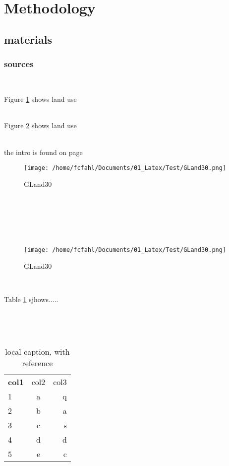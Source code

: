 \documentclass{report}
\begin{document}
\lipsum[6]\

\lipsum[7]\

\section{Methodology}\label{sec:meth}
\subsection{materials}

\subsubsection{sources}

\lipsum[8]\
\lipsum[9]\

Figure \ref{fig:gland30} shows land use\\

\lipsum[9]\

Figure \ref{fig:gland30_2} shows land use\\

\lipsum[10]\
\lipsum[11]\

the intro is found on page \pageref{sec:intro}


\begin{figure}
	\centering
	\texttt{[image: /home/fcfahl/Documents/01\_Latex/Test/GLand30.png]}
	\caption[Option caption]{GLand30}
	\label{fig:gland30}
\end{figure}


\lipsum[10]\

\lipsum[11]\

\lipsum[10]\

\begin{figure}
	\centering
	\texttt{[image: /home/fcfahl/Documents/01\_Latex/Test/GLand30.png]}
	\caption[Option caption]{GLand30}
	\label{fig:gland30_2}
\end{figure}

\lipsum[11]\

Table \ref{tab:test table 1} sjhows.....

\lipsum[10]\

\lipsum[11]\

\begin{table}[H]

	\centering
	\caption[this is an optional caption, without reference]{local caption, with reference}
	\label{tab:test table 1}
	\begin{tabular}{lcr}
		\bfseries{col1} & col2 & col3\\
		1 & a & q\\
		2 & b & a\\
		3 & c & s\\		
		4 & d & d\\
		5 & e & c\\		
		
	
	\end{tabular}

\end{table}
\end{document}
